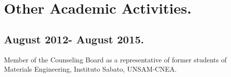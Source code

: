 \section{Other Academic Activities.}

\subsection{August 2012- August 2015.} Member of the Counseling Board as a representative of
former students of Materials Engineering, Instituto Sabato, UNSAM-CNEA.

